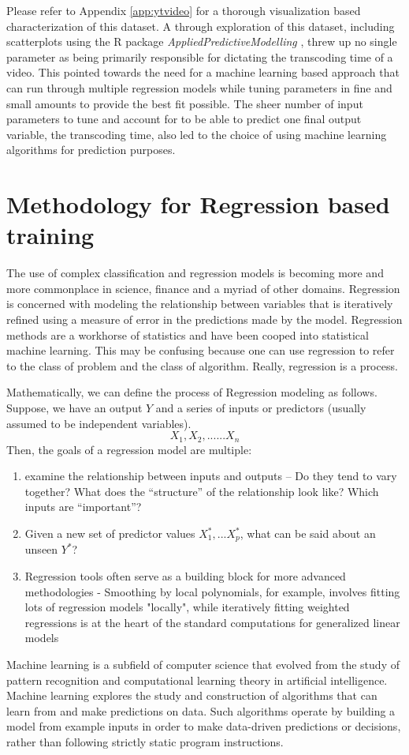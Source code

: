 \documentclass[letterpaper,12pt,titlepage,oneside,final]{report}
\begin{document}
        Please refer to Appendix \ref{app:ytvideo} for a thorough visualization based characterization of this dataset. A through exploration of this dataset, including scatterplots using the R package \textit{AppliedPredictiveModelling} \cite{apppredic}, threw up no single parameter as being primarily responsible for dictating the transcoding time of a video. This pointed towards the need for a machine learning based approach that can run through multiple regression models while tuning parameters in fine and small amounts to provide the best fit possible. The sheer number of input parameters to tune and account for to be able to predict one final output variable, the transcoding time, also led to the choice of using machine learning algorithms for prediction purposes.

    \section {Methodology for Regression based training}
        The use of complex classification and regression models is becoming more and more commonplace in science, finance and a myriad of other domains. Regression is concerned with modeling the relationship between variables that is iteratively refined using a measure of error in the predictions made by the model. Regression methods are a workhorse of statistics and have been cooped into statistical machine learning. This may be confusing because one can use regression to refer to the class of problem and the class of algorithm. Really, regression is a process.

        Mathematically, we can define the process of Regression modeling as follows. Suppose, we have an output $Y$ and a series of inputs or predictors (usually assumed to be independent variables). $$X_1, X_2, ...... X_n$$
        Then, the goals of a regression model are multiple:
        \begin{enumerate}
            \item {examine the relationship between inputs and outputs -- Do they tend to vary together? What does the “structure” of the relationship look like? Which inputs are “important”?}
            \item{ Given a new set of predictor values $X^{*}_1,...X^{*}_p$, what can be said about an unseen $Y^{*}$?}
            \item { Regression tools often serve as a building block for more advanced methodologies - Smoothing by local polynomials, for example, involves fitting lots of regression models "locally", while iteratively fitting weighted regressions is at the heart of the standard computations for generalized linear models}
        \end{enumerate}
        Machine learning is a subfield of computer science that evolved from the study of pattern recognition and computational learning theory in artificial intelligence. Machine learning explores the study and construction of algorithms that can learn from and make predictions on data. Such algorithms operate by building a model from example inputs in order to make data-driven predictions or decisions, rather than following strictly static program instructions.
\end{document}
